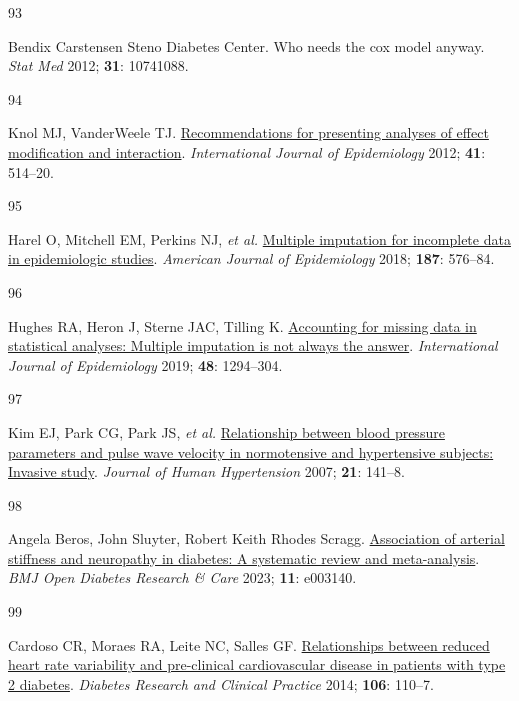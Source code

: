 \documentclass[
  a4paper,
  headsepline=true,
  open=any]{scrbook}
\newlength{\cslhangindent}
\newlength{\csllabelwidth}
\newlength{\cslentryspacingunit} %
\newenvironment{CSLReferences}[2] %
 {%
  \setlength{\parindent}{0pt}
  \ifodd #1
  \let\oldpar\par
  \def\par{\hangindent=\cslhangindent\oldpar}
  \fi
  \setlength{\parskip}{#2\cslentryspacingunit}
 }%
 {}
\newcommand{\CSLLeftMargin}[1]{\parbox[t]{\csllabelwidth}{#1}}
\newcommand{\CSLRightInline}[1]{\parbox[t]{\linewidth - \csllabelwidth}{#1}\break}
\begin{document}
\begin{CSLReferences}{0}{0}
\leavevmode{}%
\CSLLeftMargin{93 }%
\CSLRightInline{Bendix Carstensen Steno Diabetes Center. Who needs the
cox model anyway. \emph{Stat Med} 2012; \textbf{31}: 10741088.}

\leavevmode{}%
\CSLLeftMargin{94 }%
\CSLRightInline{Knol MJ, VanderWeele TJ.
\href{https://doi.org/10.1093/ije/dyr218}{Recommendations for presenting
analyses of effect modification and interaction}. \emph{International
Journal of Epidemiology} 2012; \textbf{41}: 514--20.}

\leavevmode{}%
\CSLLeftMargin{95 }%
\CSLRightInline{Harel O, Mitchell EM, Perkins NJ, \emph{et al.}
\href{https://doi.org/10.1093/aje/kwx349}{Multiple imputation for
incomplete data in epidemiologic studies}. \emph{American Journal of
Epidemiology} 2018; \textbf{187}: 576--84.}

\leavevmode{}%
\CSLLeftMargin{96 }%
\CSLRightInline{Hughes RA, Heron J, Sterne JAC, Tilling K.
\href{https://doi.org/10.1093/ije/dyz032}{Accounting for missing data in
statistical analyses: Multiple imputation is not always the answer}.
\emph{International Journal of Epidemiology} 2019; \textbf{48}:
1294--304.}

\leavevmode{}%
\CSLLeftMargin{97 }%
\CSLRightInline{Kim EJ, Park CG, Park JS, \emph{et al.}
\href{https://doi.org/10.1038/sj.jhh.1002120}{Relationship between blood
pressure parameters and pulse wave velocity in normotensive and
hypertensive subjects: Invasive study}. \emph{Journal of Human
Hypertension} 2007; \textbf{21}: 141--8.}

\leavevmode{}%
\CSLLeftMargin{98 }%
\CSLRightInline{Angela Beros, John Sluyter, Robert Keith Rhodes Scragg.
\href{https://doi.org/10.1136/bmjdrc-2022-003140}{Association of
arterial stiffness and neuropathy in diabetes: A systematic review and
meta-analysis}. \emph{BMJ Open Diabetes Research \& Care} 2023;
\textbf{11}: e003140.}

\leavevmode{}%
\CSLLeftMargin{99 }%
\CSLRightInline{Cardoso CR, Moraes RA, Leite NC, Salles GF.
\href{https://doi.org/10.1016/j.diabres.2014.07.005}{Relationships
between reduced heart rate variability and pre-clinical cardiovascular
disease in patients with type 2 diabetes}. \emph{Diabetes Research and
Clinical Practice} 2014; \textbf{106}: 110--7.}


\end{CSLReferences}
\end{document}
